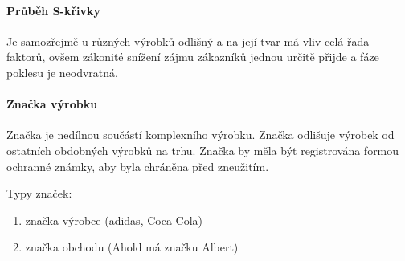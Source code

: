 \documentclass[11pt,a4paper,twoside]{book}
\begin{document}
	\paragraph*{Průběh S-křivky}
	Je samozřejmě u různých výrobků odlišný a na její tvar má vliv celá řada faktorů, ovšem zákonité snížení zájmu zákazníků jednou určitě přijde a fáze poklesu je neodvratná.

	\paragraph*{Značka výrobku}
	Značka je nedílnou součástí komplexního výrobku. Značka odlišuje výrobek od ostatních obdobných výrobků na trhu. Značka by měla být registrována formou ochranné známky, aby byla chráněna před zneužitím.

	Typy značek:
	\begin{enumerate}
		\item značka výrobce (adidas, Coca Cola)
		\item značka obchodu (Ahold má značku Albert)
	\end{enumerate}
\end{document}
